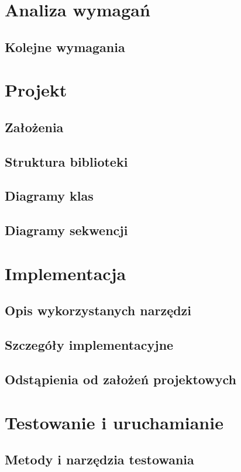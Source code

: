 \documentclass[11pt,oneside,a4paper,final]{llncs}
\begin{document}
\section{Analiza wymagań}
\subsection{Kolejne wymagania\newline}

\section{Projekt}
\subsection{Założenia}
\subsection{Struktura biblioteki}
\subsection{Diagramy klas}
\subsection{Diagramy sekwencji\newline}

\section{Implementacja}
\subsection{Opis wykorzystanych narzędzi}
\subsection{Szczegóły implementacyjne}
\subsection{Odstąpienia od założeń projektowych\newline}

\section{Testowanie i uruchamianie}
\subsection{Metody i narzędzia testowania}
\end{document}

